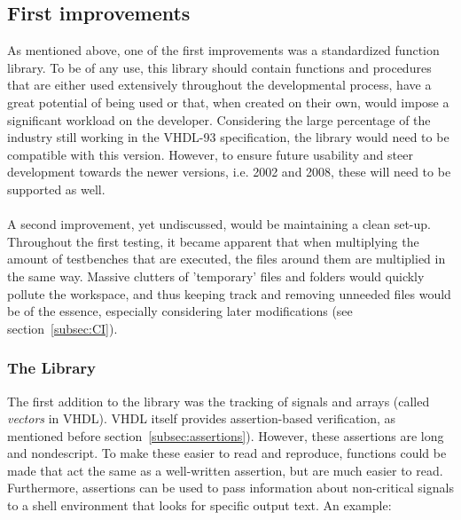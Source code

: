 \documentclass[11pt,british]{article}
\begin{document}
\subsection{First improvements}
As mentioned above, one of the first improvements was a standardized function library. To be of any use, this library should contain functions and procedures that are either used extensively throughout the developmental process, have a great potential of being used or that, when created on their own, would impose a significant workload on the developer. Considering the large percentage of the industry still working in the VHDL-93 specification, the library would need to be compatible with this version. However, to ensure future usability and steer development towards the newer versions, i.e. 2002 and 2008, these will need to be supported as well.\\
\\
A second improvement, yet undiscussed, would be maintaining a clean set-up. Throughout the first testing, it became apparent that when multiplying the amount of testbenches that are executed, the files around them are multiplied in the same way. Massive clutters of 'temporary' files and folders would quickly pollute the workspace, and thus keeping track and removing unneeded files would be of the essence, especially considering later modifications (see section~\ref{subsec:CI}).

\subsubsection{The Library}
\label{subsubsec:library}
The first addition to the library was the tracking of signals and arrays (called \emph{vectors} in VHDL). VHDL itself provides assertion-based verification, as mentioned before section~\ref{subsec:assertions}). However, these assertions are long and nondescript. To make these easier to read and reproduce, functions could be made that act the same as a well-written assertion, but are much easier to read. Furthermore, assertions can be used to pass information about non-critical signals to a shell environment that looks for specific output text. An example:
\end{document}
